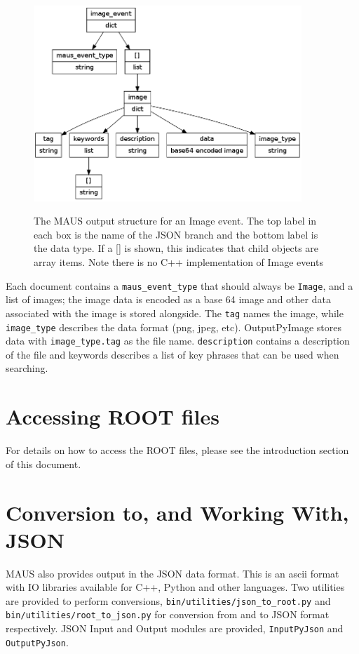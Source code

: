 \begin{figure}[!htb]
\centering
\includegraphics[width=0.9\textwidth]{image_structure.png}
\label{fig:image-structure}
\caption{The MAUS output structure for an Image event. The top label in each box is the name of the JSON branch and the bottom label is the data type. If a [] is shown, this indicates that child objects are array items. Note there is no C++ implementation of Image events}
\end{figure}

Each document contains a \verb|maus_event_type| that should always be \verb|Image|, and a list of images; the image data is encoded as a base 64 image and other data associated with the image is stored alongside. The \verb|tag| names the image, while \verb|image_type| describes the data format (png, jpeg, etc). OutputPyImage stores data with \verb|image_type.tag| as the file name.  \verb|description| contains a description of the file and keywords describes a list of key phrases that can be used when searching. 

\section{Accessing ROOT files}
For details on how to access the ROOT files, please see the introduction section of this document.

\section{Conversion to, and Working With, JSON}
MAUS also provides output in the JSON data format. This is an ascii format with IO libraries available for C++, Python and other languages. Two utilities are provided to perform conversions, \verb|bin/utilities/json_to_root.py| and \verb|bin/utilities/root_to_json.py| for conversion from and to JSON format respectively. JSON Input and Output modules are provided, \verb|InputPyJson| and \verb|OutputPyJson|.

